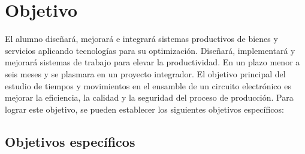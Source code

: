     \section{Objetivo}
    El alumno diseñará, mejorará e integrará sistemas productivos de bienes y servicios aplicando tecnologías para su optimización.
    Diseñará, implementará y mejorará sistemas de trabajo para elevar la productividad.
    En un plazo menor a seis meses y se plasmara en un proyecto integrador.
    El objetivo principal del estudio de tiempos y movimientos en el ensamble de un circuito electrónico es mejorar la eficiencia, la calidad y la seguridad del proceso de producción. Para lograr este objetivo, se pueden establecer los siguientes objetivos específicos:
    \subsection{Objetivos específicos}
    
    
